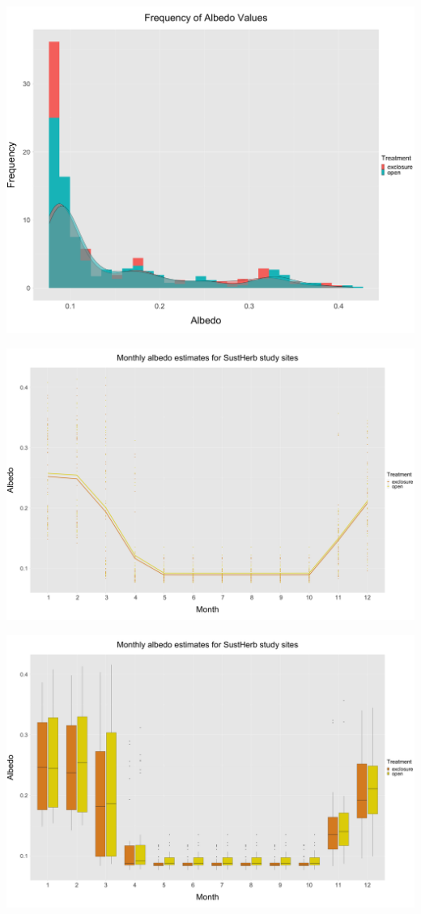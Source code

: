 \documentclass[]{article}
\begin{document}
\begin{center}\includegraphics[width=0.8\linewidth]{../../../Approach_3/Output/Albedo_Estimates/albedo_histogram_approach_3} \end{center}

\begin{center}\includegraphics[width=1\linewidth]{../../../Approach_3/Output/Albedo_Estimates/albedo_time_series_approach_3} \end{center}

\begin{center}\includegraphics[width=1\linewidth]{../../../Approach_3/Output/Albedo_Estimates/albedo_grouped_boxplot_approach_3} \end{center}
\end{document}
